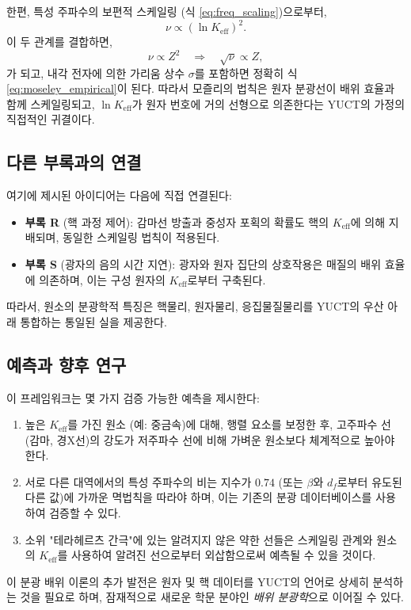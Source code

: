 \documentclass[12pt,a4paper]{article}
\begin{document}
	한편, 특성 주파수의 보편적 스케일링 (식 \ref{eq:freq_scaling})으로부터,
	\[
	\nu \propto (\ln K_{\mathrm{eff}})^2.
	\]
	이 두 관계를 결합하면,
	\[
	\nu \propto Z^2 \quad \Longrightarrow \quad \sqrt{\nu} \propto Z,
	\]
	가 되고, 내각 전자에 의한 가리움 상수 \(\sigma\)를 포함하면 정확히 식 \ref{eq:moseley_empirical}이 된다. 따라서 모즐리의 법칙은 원자 분광선이 배위 효율과 함께 스케일링되고, \(\ln K_{\mathrm{eff}}\)가 원자 번호에 거의 선형으로 의존한다는 YUCT의 가정의 직접적인 귀결이다.
	
	\subsection{다른 부록과의 연결}
	
	여기에 제시된 아이디어는 다음에 직접 연결된다:
	\begin{itemize}
		\item \textbf{부록 R} (핵 과정 제어): 감마선 방출과 중성자 포획의 확률도 핵의 \(K_{\mathrm{eff}}\)에 의해 지배되며, 동일한 스케일링 법칙이 적용된다.
		\item \textbf{부록 S} (광자의 음의 시간 지연): 광자와 원자 집단의 상호작용은 매질의 배위 효율에 의존하며, 이는 구성 원자의 \(K_{\mathrm{eff}}\)로부터 구축된다.
	\end{itemize}
	따라서, 원소의 분광학적 특징은 핵물리, 원자물리, 응집물질물리를 YUCT의 우산 아래 통합하는 통일된 실을 제공한다.
	
	\subsection{예측과 향후 연구}
	
	이 프레임워크는 몇 가지 검증 가능한 예측을 제시한다:
	\begin{enumerate}
		\item 높은 \(K_{\mathrm{eff}}\)를 가진 원소 (예: 중금속)에 대해, 행렬 요소를 보정한 후, 고주파수 선 (감마, 경X선)의 강도가 저주파수 선에 비해 가벼운 원소보다 체계적으로 높아야 한다.
		\item 서로 다른 대역에서의 특성 주파수의 비는 지수가 \(0.74\) (또는 \(\beta\)와 \(d_f\)로부터 유도된 다른 값)에 가까운 멱법칙을 따라야 하며, 이는 기존의 분광 데이터베이스를 사용하여 검증할 수 있다.
		\item 소위 "테라헤르츠 간극"에 있는 알려지지 않은 약한 선들은 스케일링 관계와 원소의 \(K_{\mathrm{eff}}\)를 사용하여 알려진 선으로부터 외삽함으로써 예측될 수 있을 것이다.
	\end{enumerate}
	
	이 분광 배위 이론의 추가 발전은 원자 및 핵 데이터를 YUCT의 언어로 상세히 분석하는 것을 필요로 하며, 잠재적으로 새로운 학문 분야인 \emph{배위 분광학}으로 이어질 수 있다.
	
\end{document}
